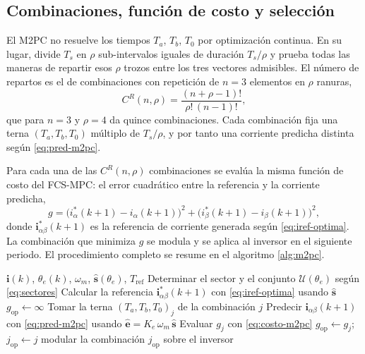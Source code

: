 \documentclass[../../../Tesis_JALS_Maestria.tex]{subfiles}
\begin{document}
\subsection{Combinaciones, función de costo y selección}
\label{sec:m2pc-costo}

El M2PC no resuelve los tiempos $T_a$, $T_b$, $T_0$ por optimización continua. En su lugar, divide $T_s$ en $\rho$ sub-intervalos iguales de duración $T_s/\rho$ y prueba todas las maneras de repartir esos $\rho$ trozos entre los tres vectores admisibles. El número de repartos es el de combinaciones con repetición de $n=3$ elementos en $\rho$ ranuras,
\begin{equation}
    C^R(n,\rho) = \frac{(n+\rho-1)!}{\rho!\,(n-1)!},
    \label{eq:combinaciones}
\end{equation}
que para $n=3$ y $\rho=4$ da quince combinaciones. Cada combinación fija una terna $(T_a,T_b,T_0)$ múltiplo de $T_s/\rho$, y por tanto una corriente predicha distinta según \eqref{eq:pred-m2pc}.

Para cada una de las $C^R(n,\rho)$ combinaciones se evalúa la misma función de costo del FCS-MPC: el error cuadrático entre la referencia y la corriente predicha,
\begin{equation}
    g = \bigl(i_\alpha^*(k+1) - i_\alpha(k+1)\bigr)^2 + \bigl(i_\beta^*(k+1) - i_\beta(k+1)\bigr)^2,
    \label{eq:costo-m2pc}
\end{equation}
donde $\mathbf{i}_{\alpha\beta}^*(k+1)$ es la referencia de corriente generada según \eqref{eq:iref-optima}. La combinación que minimiza $g$ se modula y se aplica al inversor en el siguiente periodo. El procedimiento completo se resume en el algoritmo \ref{alg:m2pc}.

\begin{algorithm}[htbp]
\caption{FCS-M2PC para un periodo de muestreo}
\label{alg:m2pc}
\begin{algorithmic}[1]
\Require $\mathbf{i}(k)$, $\theta_e(k)$, $\omega_m$, $\hat{\mathbf{s}}(\theta_e)$, $T_\mathrm{ref}$
\State Determinar el sector y el conjunto $\mathcal{U}(\theta_e)$ según \eqref{eq:sectores}
\State Calcular la referencia $\mathbf{i}_{\alpha\beta}^*(k+1)$ con \eqref{eq:iref-optima} usando $\hat{\mathbf{s}}$
\State $g_\mathrm{op} \gets \infty$
    \State Tomar la terna $(T_a,T_b,T_0)_j$ de la combinación $j$
    \State Predecir $\mathbf{i}_{\alpha\beta}(k+1)$ con \eqref{eq:pred-m2pc} usando $\hat{\mathbf{e}} = K_e\,\omega_m\,\hat{\mathbf{s}}$
    \State Evaluar $g_j$ con \eqref{eq:costo-m2pc}
        \State $g_\mathrm{op} \gets g_j$;\quad $j_\mathrm{op} \gets j$
    \EndIf
\EndFor
\State \Return modular la combinación $j_\mathrm{op}$ sobre el inversor
\end{algorithmic}
\end{algorithm}
\end{document}
